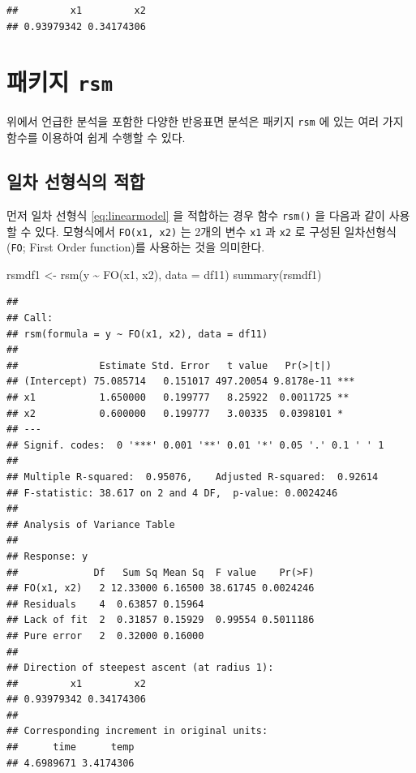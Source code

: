 \documentclass[
]{book}
\newenvironment{Shaded}{\begin{snugshade}}{\end{snugshade}}
\newcommand{\AttributeTok}[1]{\textcolor[rgb]{0.77,0.63,0.00}{#1}}
\newcommand{\FunctionTok}[1]{\textcolor[rgb]{0.00,0.00,0.00}{#1}}
\newcommand{\NormalTok}[1]{#1}
\newcommand{\OtherTok}[1]{\textcolor[rgb]{0.56,0.35,0.01}{#1}}
\newcommand{\SpecialCharTok}[1]{\textcolor[rgb]{0.00,0.00,0.00}{#1}}
\theoremstyle{definition}
\theoremstyle{definition}
\theoremstyle{definition}
\theoremstyle{definition}
\theoremstyle{remark}
\begin{document}
\begin{verbatim}
##         x1         x2 
## 0.93979342 0.34174306
\end{verbatim}

\hypertarget{uxd328uxd0a4uxc9c0-rsm}{%
\section{\texorpdfstring{패키지 \texttt{rsm}}{패키지 rsm}}\label{uxd328uxd0a4uxc9c0-rsm}}

위에서 언급한 분석을 포함한 다양한 반응표면 분석은 패키지 \texttt{rsm} 에 있는 여러 가지 함수를 이용하여 쉽게 수행할 수 있다.

\hypertarget{uxc77cuxcc28-uxc120uxd615uxc2dduxc758-uxc801uxd569}{%
\subsection{일차 선형식의 적합}\label{uxc77cuxcc28-uxc120uxd615uxc2dduxc758-uxc801uxd569}}

먼저 일차 선형식 \eqref{eq:linearmodel} 을 적합하는 경우 함수 \texttt{rsm()} 을 다음과 같이 사용할 수 있다.
모형식에서 \texttt{FO(x1,\ x2)} 는 2개의 변수 \texttt{x1} 과 \texttt{x2} 로 구성된 일차선형식(\texttt{FO}; First Order function)를 사용하는 것을 의미한다.

\begin{Shaded}
\begin{Highlighting}[]
\NormalTok{rsmdf1 }\OtherTok{\textless{}{-}} \FunctionTok{rsm}\NormalTok{(y }\SpecialCharTok{\textasciitilde{}} \FunctionTok{FO}\NormalTok{(x1, x2), }\AttributeTok{data =}\NormalTok{ df11)}
\FunctionTok{summary}\NormalTok{(rsmdf1)}
\end{Highlighting}
\end{Shaded}

\begin{verbatim}
## 
## Call:
## rsm(formula = y ~ FO(x1, x2), data = df11)
## 
##              Estimate Std. Error   t value   Pr(>|t|)    
## (Intercept) 75.085714   0.151017 497.20054 9.8178e-11 ***
## x1           1.650000   0.199777   8.25922  0.0011725 ** 
## x2           0.600000   0.199777   3.00335  0.0398101 *  
## ---
## Signif. codes:  0 '***' 0.001 '**' 0.01 '*' 0.05 '.' 0.1 ' ' 1
## 
## Multiple R-squared:  0.95076,    Adjusted R-squared:  0.92614 
## F-statistic: 38.617 on 2 and 4 DF,  p-value: 0.0024246
## 
## Analysis of Variance Table
## 
## Response: y
##             Df   Sum Sq Mean Sq  F value    Pr(>F)
## FO(x1, x2)   2 12.33000 6.16500 38.61745 0.0024246
## Residuals    4  0.63857 0.15964                   
## Lack of fit  2  0.31857 0.15929  0.99554 0.5011186
## Pure error   2  0.32000 0.16000                   
## 
## Direction of steepest ascent (at radius 1):
##         x1         x2 
## 0.93979342 0.34174306 
## 
## Corresponding increment in original units:
##      time      temp 
## 4.6989671 3.4174306
\end{verbatim}
\end{document}
